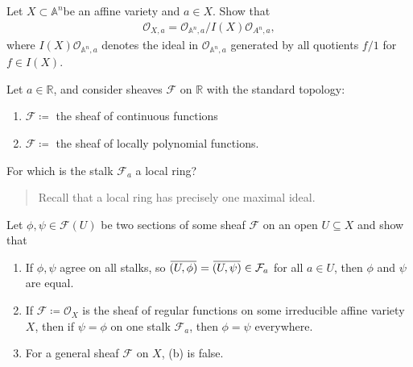 \begin{exercise}[Gathmann 3.20]

Let \(X\subset {\mathbb{A}}^n\)be an affine variety and \(a\in X\). Show
that
\begin{align*}  
{\mathcal{O}}_{X, a} = {\mathcal{O}}_{{\mathbb{A}}^n, a} / I(X) {\mathcal{O}}_{A^n,a}
,\end{align*}
where \(I(X) {\mathcal{O}}_{{\mathbb{A}}^n, a}\) denotes the ideal in
\({\mathcal{O}}_{{\mathbb{A}}^n, a}\) generated by all quotients \(f/1\)
for \(f\in I(X)\).

\end{exercise}

\begin{exercise}[Gathmann 3.21]

Let \(a\in {\mathbb{R}}\), and consider sheaves \(\mathcal{F}\) on
\({\mathbb{R}}\) with the standard topology:

\begin{enumerate}
\def\labelenumi{\arabic{enumi}.}
\tightlist
\item
  \(\mathcal{F} \coloneqq\) the sheaf of continuous functions
\item
  \(\mathcal{F} \coloneqq\) the sheaf of locally polynomial functions.
\end{enumerate}

For which is the stalk \(\mathcal{F}_a\) a local ring?

\begin{quote}
Recall that a local ring has precisely one maximal ideal.
\end{quote}

\end{exercise}

\begin{exercise}[Gathmann 3.22]

Let \(\phi, \psi \in \mathcal{F}(U)\) be two sections of some sheaf
\(\mathcal{F}\) on an open \(U\subseteq X\) and show that

\begin{enumerate}
\def\labelenumi{\alph{enumi}.}
\item
  If \(\phi, \psi\) agree on all stalks, so
  \(\mkern 1.5mu\overline{\mkern-1.5mu(U, \phi)\mkern-1.5mu}\mkern 1.5mu = \mkern 1.5mu\overline{\mkern-1.5mu(U, \psi)\mkern-1.5mu}\mkern 1.5mu \in \mathcal{F}_a\)
  for all \(a\in U\), then \(\phi\) and \(\psi\) are equal.
\item
  If \(\mathcal{F} \coloneqq{\mathcal{O}}_X\) is the sheaf of regular
  functions on some irreducible affine variety \(X\), then if
  \(\psi = \phi\) on one stalk \(\mathcal{F}_a\), then \(\phi = \psi\)
  everywhere.
\item
  For a general sheaf \(\mathcal{F}\) on \(X\), (b) is false.
\end{enumerate}

\end{exercise}

